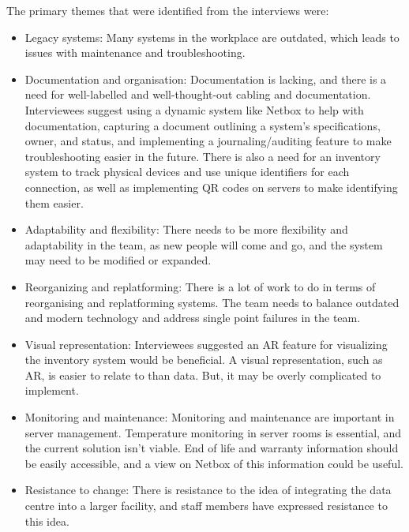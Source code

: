 \documentclass [11pt,a4paper]{article}
\begin{document}
The primary themes that were identified from the interviews were:

\begin{itemize}
    \item Legacy systems: Many systems in the workplace are outdated, which leads to issues with maintenance and troubleshooting.

    \item Documentation and organisation: Documentation is lacking, and there is a need for well-labelled and well-thought-out cabling and documentation. Interviewees suggest using a dynamic system like Netbox to help with documentation, capturing a document outlining a system's specifications, owner, and status, and implementing a journaling/auditing feature to make troubleshooting easier in the future. There is also a need for an inventory system to track physical devices and use unique identifiers for each connection, as well as implementing QR codes on servers to make identifying them easier.

    \item Adaptability and flexibility: There needs to be more flexibility and adaptability in the team, as new people will come and go, and the system may need to be modified or expanded.

    \item Reorganizing and replatforming: There is a lot of work to do in terms of reorganising and replatforming systems. The team needs to balance outdated and modern technology and address single point failures in the team.

    \item Visual representation: Interviewees suggested an AR feature for visualizing the inventory system would be beneficial. A visual representation, such as AR, is easier to relate to than data. But, it may be overly complicated to implement.

    \item Monitoring and maintenance: Monitoring and maintenance are important in server management. Temperature monitoring in server rooms is essential, and the current solution isn't viable. End of life and warranty information should be easily accessible, and a view on Netbox of this information could be useful.

    \item Resistance to change: There is resistance to the idea of integrating the data centre into a larger facility, and staff members have expressed resistance to this idea.

\end{itemize}
\end{document}
